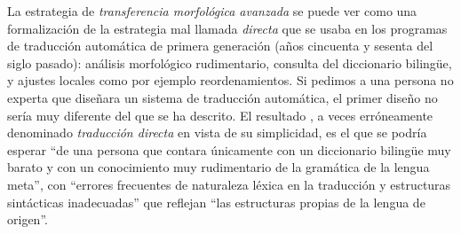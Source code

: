 La estrategia de \emph{transferencia morfológica avanzada} se puede ver como una formalización de la estrategia mal llamada \emph{directa} que se usaba en los programas de traducción automática de primera generación (años cincuenta y sesenta del siglo pasado): análisis morfológico rudimentario, consulta del diccionario bilingüe, y ajustes locales como por ejemplo reordenamientos. Si pedimos a una persona no experta que diseñara un sistema de traducción automática, el primer diseño no sería muy diferente del que se ha descrito. El resultado \citep[sección~4.2]{hutchins92b}, a veces erróneamente denominado \emph{traducción directa} en vista de su simplicidad, es el que se podría esperar ``de una persona que contara únicamente con un diccionario bilingüe muy barato y con un conocimiento muy rudimentario de la gramática de la lengua meta'', con ``errores frecuentes de naturaleza léxica en la traducción y estructuras sintácticas inadecuadas'' que reflejan ``las estructuras propias de la lengua de origen''. 

